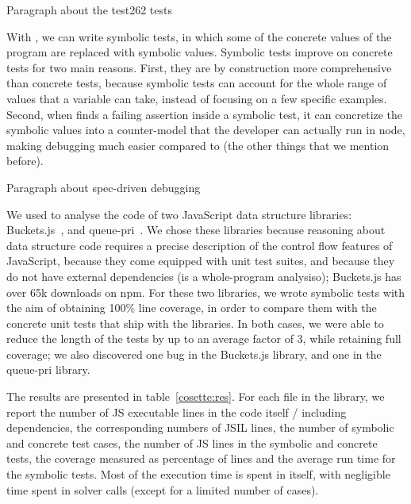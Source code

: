 
Paragraph about the test262 tests

With \cosette, we can write symbolic tests, in which some of the concrete values of the program are replaced with symbolic values.
Symbolic tests improve on concrete tests for two main reasons.
First, they are by construction more comprehensive than concrete tests, because symbolic tests can account for the whole range of values that a variable can take, instead of focusing on a few specific examples.
Second, when \cosette finds a failing assertion inside a symbolic test, it can concretize the symbolic values into a counter-model that the developer can actually run in node, making debugging much easier compared to (the other things that we mention before).

Paragraph about spec-driven debugging

We used \cosette to analyse the code of two JavaScript data structure libraries: Buckets.js~\cite{buckets}, and queue-pri~\cite{priq}.
We chose these libraries because reasoning about data structure code requires a precise description of the control flow features of JavaScript, because they come equipped with unit test suites, and because they do not have external dependencies (\cosette is a whole-program analysiso); Buckets.js has over 65k downloads on npm.
For these two libraries, we wrote symbolic tests with the aim of obtaining 100\% line coverage, in order to compare them with the concrete unit tests that ship with the libraries.
In both cases, we were able to reduce the length of the tests by up to an average factor of 3, while retaining full coverage; we also discovered one bug in the Buckets.js library, and one in the queue-pri library.


The results are presented in table~\ref{cosette:res}.
For each file in the library, we report the number of JS executable lines in the code itself / including dependencies, the corresponding numbers of JSIL lines, the number of symbolic and concrete test cases, the number of JS lines in the symbolic and concrete tests, the coverage measured as percentage of lines and the average \cosette run time for the symbolic tests.
Most of the execution time is spent in \cosette itself, with negligible time spent in solver calls (except for a limited number of cases).


